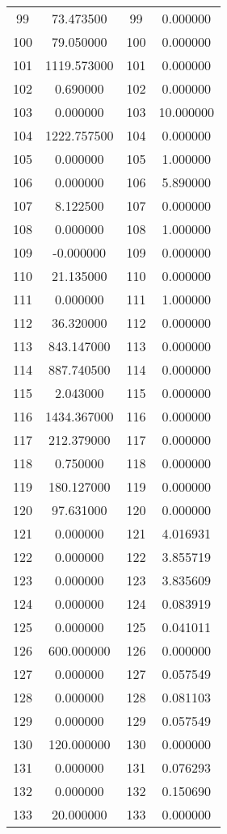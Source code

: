 \documentclass[12pt]{article}
\begin{document}
\begin{longtable}{@{}cccc@{}}
99 & 73.473500 & 99 & 0.000000 \\
100 & 79.050000 & 100 & 0.000000 \\
101 & 1119.573000 & 101 & 0.000000 \\
102 & 0.690000 & 102 & 0.000000 \\
103 & 0.000000 & 103 & 10.000000 \\
104 & 1222.757500 & 104 & 0.000000 \\
105 & 0.000000 & 105 & 1.000000 \\
106 & 0.000000 & 106 & 5.890000 \\
107 & 8.122500 & 107 & 0.000000 \\
108 & 0.000000 & 108 & 1.000000 \\
109 & -0.000000 & 109 & 0.000000 \\
110 & 21.135000 & 110 & 0.000000 \\
111 & 0.000000 & 111 & 1.000000 \\
112 & 36.320000 & 112 & 0.000000 \\
113 & 843.147000 & 113 & 0.000000 \\
114 & 887.740500 & 114 & 0.000000 \\
115 & 2.043000 & 115 & 0.000000 \\
116 & 1434.367000 & 116 & 0.000000 \\
117 & 212.379000 & 117 & 0.000000 \\
118 & 0.750000 & 118 & 0.000000 \\
119 & 180.127000 & 119 & 0.000000 \\
120 & 97.631000 & 120 & 0.000000 \\
121 & 0.000000 & 121 & 4.016931 \\
122 & 0.000000 & 122 & 3.855719 \\
123 & 0.000000 & 123 & 3.835609 \\
124 & 0.000000 & 124 & 0.083919 \\
125 & 0.000000 & 125 & 0.041011 \\
126 & 600.000000 & 126 & 0.000000 \\
127 & 0.000000 & 127 & 0.057549 \\
128 & 0.000000 & 128 & 0.081103 \\
129 & 0.000000 & 129 & 0.057549 \\
130 & 120.000000 & 130 & 0.000000 \\
131 & 0.000000 & 131 & 0.076293 \\
132 & 0.000000 & 132 & 0.150690 \\
133 & 20.000000 & 133 & 0.000000 \\

\end{longtable}
\end{document}
